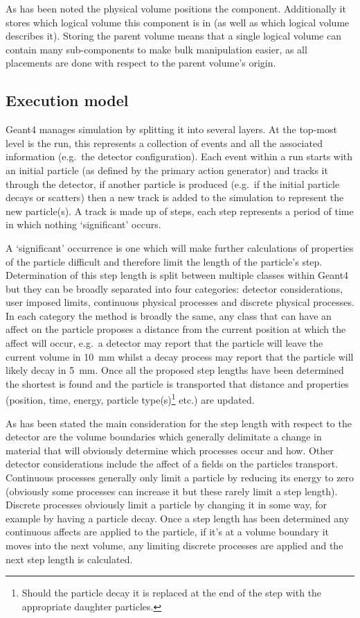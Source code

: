 As has been noted the physical volume positions the component. Additionally it stores which logical volume this component is in (as well as which logical volume describes it). Storing the parent volume means that a single logical volume can contain many sub-components to make bulk manipulation easier, as all placements are done with respect to the parent volume's origin.

\subsection{Execution model} %
\label{sub:execution_model}

Geant4 manages simulation by splitting it into several layers. At the top-most level is the run, this represents a collection of events and all the associated information (e.g.\ the detector configuration). Each event within a run starts with an initial particle (as defined by the primary action generator) and tracks it through the detector, if another particle is produced (e.g.\ if the initial particle decays or scatters) then a new track is added to the simulation to represent the new particle(s). A track is made up of steps, each step represents a period of time in which nothing `significant' occurs.

A `significant' occurrence is one which will make further calculations of properties of the particle difficult and therefore limit the length of the particle's step. Determination of this step length is split between multiple classes within Geant4 but they can be broadly separated into four categories: detector considerations, user imposed limits, continuous physical processes and discrete physical processes. In each category the method is broadly the same, any class that can have an affect on the particle proposes a distance from the current position at which the affect will occur, e.g.\ a detector may report that the particle will leave the current volume in 10~mm whilst a decay process may report that the particle will likely decay in 5~mm. Once all the proposed step lengths have been determined the shortest is found and the particle is transported that distance and properties (position, time, energy, particle type(s)\footnote{Should the particle decay it is replaced at the end of the step with the appropriate daughter particles.} etc.) are updated. 

As has been stated the main consideration for the step length with respect to the detector are the volume boundaries which generally delimitate a change in material that will obviously determine which processes occur and how. Other detector considerations include the affect of a fields on the particles transport. Continuous processes generally only limit a particle by reducing its energy to zero (obviously some processes can increase it but these rarely limit a step length). Discrete processes obviously limit a particle by changing it in some way, for example by having a particle decay. Once a step length has been determined any continuous affects are applied to the particle, if it's at a volume boundary it moves into the next volume, any limiting discrete processes are applied and the next step length is calculated. 

